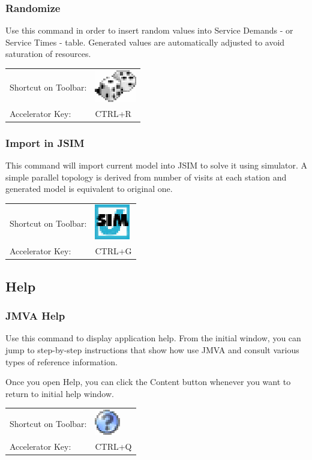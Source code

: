 \subsubsection{Randomize}
Use this command in order to insert random values into Service
Demands - or Service Times - table. Generated values are
automatically adjusted to avoid saturation of resources.

\noindent
\begin{tabular}{ll}
Shortcut on Toolbar: & \includegraphics[scale=.8]{img/jmva/randomize}\\
Accelerator Key: & CTRL+R
\end{tabular}

\subsubsection{Import in JSIM}
This command will import current model into JSIM to solve it using
simulator. A simple parallel topology is derived from number of
visits at each station and generated model is equivalent to original
one.

\noindent
\begin{tabular}{ll}
Shortcut on Toolbar: & \includegraphics[scale=.8]{img/jmva/toJSIM}\\
Accelerator Key: & CTRL+G
\end{tabular}

\subsection{Help}
\subsubsection{JMVA Help}
Use this command to display application help. From the initial
window, you can jump to step-by-step instructions that show how use
JMVA and consult various types of reference information.

Once you open Help, you can click the Content button whenever you
want to return to initial help window.

\noindent
\begin{tabular}{ll}
Shortcut on Toolbar: & \includegraphics[scale=.8]{img/jmva/help}\\
Accelerator Key: & CTRL+Q
\end{tabular}

